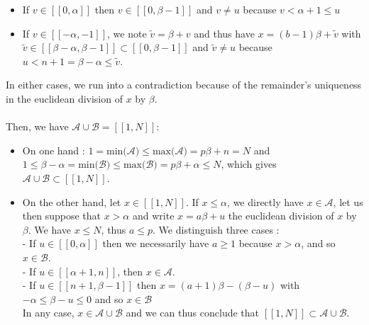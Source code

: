 \documentclass{article}
\begin{document}
\begin{itemize}
\item If $v \in [\![0,\alpha]\!]$ then $v \in [\![0,\beta - 1]\!]$ and $v \neq u$ because $v < \alpha + 1 \leqslant u$
\item If $v \in [\![-\alpha,-1]\!]$, we note $\tilde{v} = \beta + v$ and thus have $x = (b-1)\beta + \tilde{v}$ with $\tilde{v} \in [\![\beta - \alpha,\beta - 1]\!] \subset [\![0,\beta - 1]\!]$ and $\tilde{v} \neq u$ because $u < n+1 = \beta - \alpha \leqslant \tilde{v}$.
\end{itemize}
In either cases, we run into a contradiction because of the remainder's uniqueness in the euclidean division of $x$ by $\beta$.\\
\\
Then, we have \underline{$\mathcal{A} \cup \mathcal{B} = [\![1,N]\!]$}:
\begin{itemize}
\item On one hand : $1 = \text{min($\mathcal{A}$)} \leqslant \text{max($\mathcal{A}$)} = p\beta + n = N$ and $1 \leqslant \beta - \alpha = \text{min($\mathcal{B}$)} \leqslant \text{max($\mathcal{B}$)} = p\beta + \alpha \leqslant N$, which gives $\mathcal{A} \cup \mathcal{B} \subset [\![1,N]\!]$.
\item On the other hand, let $x \in  [\![1,N]\!]$. If $x \leqslant \alpha$, we directly have $x \in \mathcal{A}$, let us then suppose that $x > \alpha$ and write $x = a\beta + u$ the euclidean division of $x$ by $\beta$. We have $x \leqslant N$, thus $a \leqslant p$. We distinguish three cases : \\
- If $u \in [\![0,\alpha]\!]$ then we necessarily have $a \geqslant 1$ because $x > \alpha$, and so $x \in \mathcal{B}$.\\
- If $u \in [\![\alpha + 1,n]\!]$, then $x \in \mathcal{A}$. \\
- If $u \in [\![n + 1,\beta - 1]\!]$ then $x = (a+1)\beta - (\beta - u)$ with $-\alpha \leqslant \beta - u \leqslant 0$ and so $x \in \mathcal{B}$ \\
In any case, $x \in \mathcal{A} \cup \mathcal{B}$ and we can thus conclude that $[\![1,N]\!] \subset \mathcal{A} \cup \mathcal{B}$.
\end{itemize}
\end{document}
